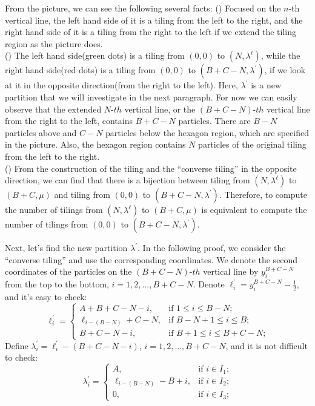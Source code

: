 \documentclass[12pt]{article}
\begin{document}
	From the picture, we can see the following several facts:
	() Focused on the $n$-th vertical line, the left hand side of it is a tiling from the left to the right, and the right hand side of it is a tiling from the right to the left if we extend the tiling region as the picture does.\\
	() The left hand side(green dots) is a tiling from $(0,0)$ to $(N,\lambda^{\ell})$, while the right hand side(red dots) is a tiling from $(0,0)$ to $(B+C-N,\lambda^{\prime})$, if we look at it in the opposite direction(from the right to the left). Here, $\lambda^{\prime}$ is a new partition that we will investigate in the next paragraph. For now we can easily observe that the extended $N$-$th$ vertical line, or the $(B+C-N)$-$th$ vertical line from the right to the left, contains $B+C-N$ particles. There are $B-N$ particles above and $C-N$ particles below the hexagon region, which are specified in the picture. Also, the hexagon region contains $N$ particles of the original tiling from the left to the right.\\
	() From the construction of the tiling and the ``converse tiling'' in the opposite direction, we can find that there is a bijection between tiling from $(N,\lambda^{\ell})$ to $(B+C,\mu)$ and tiling from $(0,0)$ to $(B+C-N,\lambda^{\prime})$. Therefore, to compute the number of tilings from $(N,\lambda^{\ell})$ to $(B+C,\mu)$ is equivalent to compute the number of tilings from $(0,0)$ to $(B+C-N,\lambda^{\prime})$.\\
	\par Next, let's find the new partition $\lambda^{\prime}$. In the following proof, we consider the ``converse tiling'' and use the corresponding coordinates. We denote the second coordinates of the particles on the $(B+C-N)$-$th$ vertical line by $y^{B+C-N}_{i}$ from the top to the bottom, $i=1,2,\dots,B+C-N$. Denote $\ell^{\prime}_{i}=y^{B+C-N}_{i}-\frac{1}{2}$, and it's easy to check: 
	$$
	\ell^{\prime}_{i}=
	\begin{cases}
	A+B+C-N-i, &\text{if $1\leqslant i\leqslant B-N$;} \\
	\ell_{i-(B-N)}+C-N, &\text{if $B-N+1\leqslant i\leqslant B$;}\\
	B+C-N-i, &\text{if $B+1\leqslant i\leqslant B+C-N$;}
	\end{cases}
	$$
	Define $\lambda_{i}^{\prime}=\ell_{i}^{\prime}-(B+C-N-i)$, $i=1,2,\dots,B+C-N$, and it is not difficult to check:
	$$
	\lambda^{\prime}_{i}=
	\begin{cases}
	A, &\text{if $i\in I_{1}$;} \\
	\ell_{i-(B-N)}-B+i, &\text{if $i\in I_{2}$;}\\
	0, &\text{if $i\in I_{3}$;}
	\end{cases}
	$$
\end{document}
